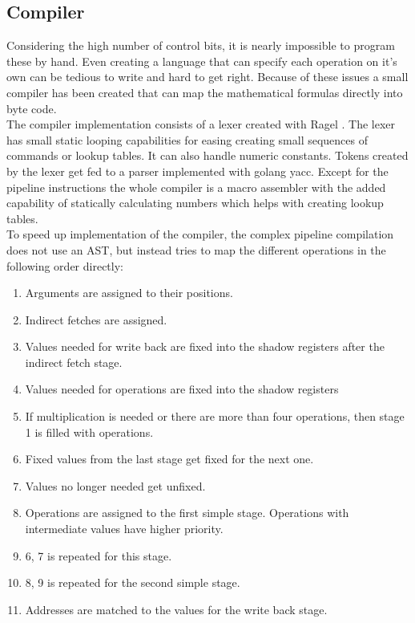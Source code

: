 \documentclass[11pt,twocolumn,technote,a4paper]{IEEEtran}
\begin{document}
\subsection{Compiler}
Considering the high number of control bits, it is nearly impossible to program
these by hand. Even creating a language that can specify each operation on it's
own can be tedious to write and hard to get right. Because of these issues a
small compiler has been created that can map the mathematical formulas directly
into byte code.\\
The compiler implementation consists of a lexer created with Ragel
\cite{thurston_parsing_2006}. The lexer has small static looping capabilities
for easing creating small sequences of commands or lookup tables. It can also
handle numeric constants. Tokens created by the lexer get fed to a parser
implemented with golang yacc. Except for the pipeline instructions the whole
compiler is a macro assembler with the added capability of statically
calculating numbers which helps with creating lookup tables.\\
To speed up implementation of the compiler, the complex pipeline compilation
does not use an AST, but instead tries to map the different operations in
the following order directly:
\begin{enumerate}
    \item Arguments are assigned to their positions.
    \item Indirect fetches are assigned.
    \item Values needed for write back are fixed into the shadow registers after
        the indirect fetch stage.
    \item Values needed for operations are fixed into the shadow registers
    \item If multiplication is needed or there are more than four operations, then
        stage 1 is filled with operations.
    \item Fixed values from the last stage get fixed for the next one.
    \item Values no longer needed get unfixed.
    \item Operations are assigned to the first simple stage. Operations with
        intermediate values have higher priority.
    \item 6, 7 is repeated for this stage.
    \item 8, 9 is repeated for the second simple stage.
    \item Addresses are matched to the values for the write back stage.
\end{enumerate}
\end{document}
